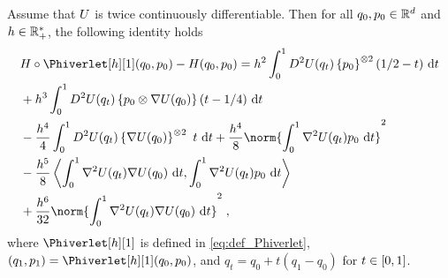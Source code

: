  \begin{lemma}
 \label{lem:diff_hamiltonian_taylor_exp}
 Assume that $U$ is twice continuously differentiable. Then for all $q_0,p_0 \in \mathbb{R}^d$ and $h \in \mathbb{R}^*_+$, the following identity holds
 \begin{align}
& \Ham \circ \Phiverlet[h][1](q_0,p_0) - \Ham(q_0,p_0) =  h^2\int_0^1D^2\F(q_t)\defEns{p_{0}}^{\otimes 2} (1/2-t) \  \rmd t \\
& + h^3 \int_0^1D^2\F(q_t)\defEns{p_{0}\otimes \nabla \F(q_{0})}(t-1/4) \ \rmd t  \\
&  -\frac{h^4}{4}\int_0^1 D^2\F(q_t)\defEns{\nabla \F(q_{0})}^{\otimes 2} \ t \  \rmd t
+\frac{h^4}{8}\norm{ \int_0^1 \nabla ^2 \F( q_{t}) p_{0} \ \rmd t  }^2\\
&   - \frac{h^5}{8}\ps{\int_0^1\nabla^2\F(q_t)\nabla \F(q_0) \ \rmd t }{\int_0^1 \nabla^2 \F(q_t)p_0 \ \rmd t }
   \\
   &+\frac{h^6}{32}\norm{\int_0^1 \nabla^2 \F( q_{t})\nabla \F (q_0) \ \rmd t }^2
\eqsp,
\end{align}
where  $\Phiverlet[h][1]$ is defined in \eqref{eq:def_Phiverlet}, $(q_1,p_1) = \Phiverlet[h][1](q_0,p_0)$, and $q_t = q_0 +t (q_1-q_0)$ for $t \in \left[0,1\right]$.
\end{lemma}
